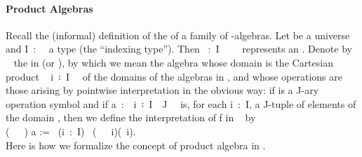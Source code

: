 \paragraph*{Product Algebras}
Recall the (informal) definition of the  of a family of
-algebras.
Let  be a universe and \ab I~:~~ a type (the ``indexing type'').
Then ~:~\ab I~~~~ represents
an .
Denote by ~ the  in  (or ), by which we mean the algebra whose domain is the Cartesian product ~\ab
i~꞉~\ab I~\af{,}~ of the domains of the algebras in , and
whose operations are those arising by pointwise interpretation in the obvious way: if
 is a \ab J-ary operation symbol and if
\ab a~:~~\ab i~꞉~\ab I~\af{,}~\ab J~~ is, for each
\ab i~:~\ab I, a \ab J-tuple of elements of the domain , then
we define the interpretation of \ab f in ~ by\\[-2mm]

(~~~) \ab a := ~(\ab i~:~\ab I)~
(~~~\ab i)(~\ab i).\\[8pt]
Here is how we formalize the concept of product algebra in \agda.


